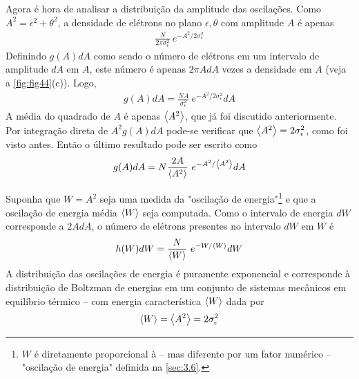 Agora é hora de analisar a distribuição da amplitude das oscilações. Como $A^2 = \epsilon^2 + \theta^2$, a densidade de elétrons no plano $\epsilon, \theta$ com amplitude $A$ é apenas
\begin{align}
	\frac{N}{2\pi \sigma_\epsilon^2}\ e^{-A^2/2\sigma_\epsilon^2}
\end{align}
Definindo $g(A)dA$ como sendo o número de elétrons em um intervalo de amplitude $dA$ em $A$, este número é apenas $2\pi AdA$ vezes a densidade em $A$ (veja a \autoref{fig:fig44}(c)). Logo,
\begin{align}
	g(A)dA = \frac{N A}{\sigma_\epsilon^2}\ e^{-A^2/2\sigma_\epsilon^2}dA
\end{align}
A média do quadrado de $A$ é apenas $\left< A^2 \right>$, que já foi discutido anteriormente. Por integração direta de $A^2 g(A)dA$ pode-se verificar que $\left< A^2 \right> = 2\sigma_\epsilon^2$, como foi visto antes. Então o último resultado pode ser escrito como
\begin{align}
	g(A)dA = N\frac{2A}{\left< A^2 \right>}\ e^{-A^2/\left< A^2 \right>}dA
\end{align}

Suponha que $W=A^2$ seja uma medida da "oscilação de energia"\footnote{$W$ é diretamente proporcional à -- mas diferente por um fator numérico -- "oscilação de energia" definida na \autoref{sec:3.6}.} e que a oscilação de energia média $\left< W \right>$ seja computada. Como o intervalo de energia $dW$ corresponde a $2AdA$, o número de elétrons presentes no intervalo $dW$ em $W$ é
\begin{align}
	h(W)dW = \frac{N}{\left< W \right>}\ e^{-W/\left< W \right>}dW
\end{align}
A distribuição das oscilações de energia é puramente exponencial e corresponde à distribuição de Boltzman de energias em um conjunto de sistemas mecânicos em equilíbrio térmico -- com energia característica $\left< W \right>$ dada por
\begin{align}
	\left< W \right> = \left< A^2 \right> = 2\sigma_\epsilon^2
\end{align}
